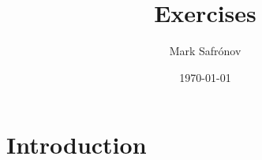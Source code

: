 \documentclass[11pt, a4paper]{report}
\title{Exercises}
\author{Mark Safrónov}
\date{\today}
\begin{document}


\tableofcontents

\section{Introduction}








%

\printbibliography
\end{document}

